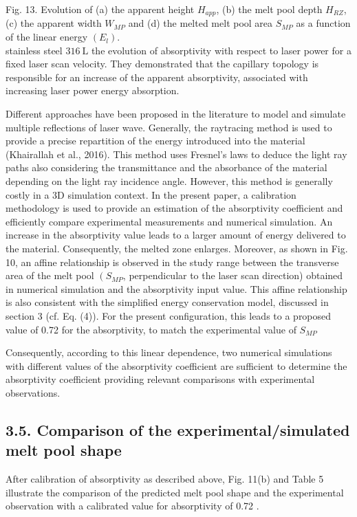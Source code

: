 \documentclass[10pt]{article}
\begin{document}
Fig. 13. Evolution of (a) the apparent height $H_{a p p}$, (b) the melt pool depth $H_{R Z}$, (c) the apparent width $W_{M P}$ and (d) the melted melt pool area $S_{M P}$ as a function of the linear energy $\left(E_{l}\right)$.\\
stainless steel $316 \mathrm{~L}$ the evolution of absorptivity with respect to laser power for a fixed laser scan velocity. They demonstrated that the capillary topology is responsible for an increase of the apparent absorptivity, associated with increasing laser power energy absorption.

Different approaches have been proposed in the literature to model and simulate multiple reflections of laser wave. Generally, the raytracing method is used to provide a precise repartition of the energy introduced into the material (Khairallah et al., 2016). This method uses Fresnel's laws to deduce the light ray paths also considering the transmittance and the absorbance of the material depending on the light ray incidence angle. However, this method is generally costly in a 3D simulation context. In the present paper, a calibration methodology is used to provide an estimation of the absorptivity coefficient and efficiently compare experimental measurements and numerical simulation. An increase in the absorptivity value leads to a larger amount of energy delivered to the material. Consequently, the melted zone enlarges. Moreover, as shown in Fig. 10, an affine relationship is observed in the study range between the transverse area of the melt pool $\left(S_{M P}\right.$, perpendicular to the laser scan direction) obtained in numerical simulation and the absorptivity input value. This affine relationship is also consistent with the simplified energy conservation model, discussed in section 3 (cf. Eq. (4)). For the present configuration, this leads to a proposed value of 0.72 for the absorptivity, to match the experimental value of $S_{M P}$

Consequently, according to this linear dependence, two numerical simulations with different values of the absorptivity coefficient are sufficient to determine the absorptivity coefficient providing relevant comparisons with experimental observations.

\subsection*{3.5. Comparison of the experimental/simulated melt pool shape}
After calibration of absorptivity as described above, Fig. 11(b) and Table 5 illustrate the comparison of the predicted melt pool shape and the experimental observation with a calibrated value for absorptivity of 0.72 .
\end{document}
